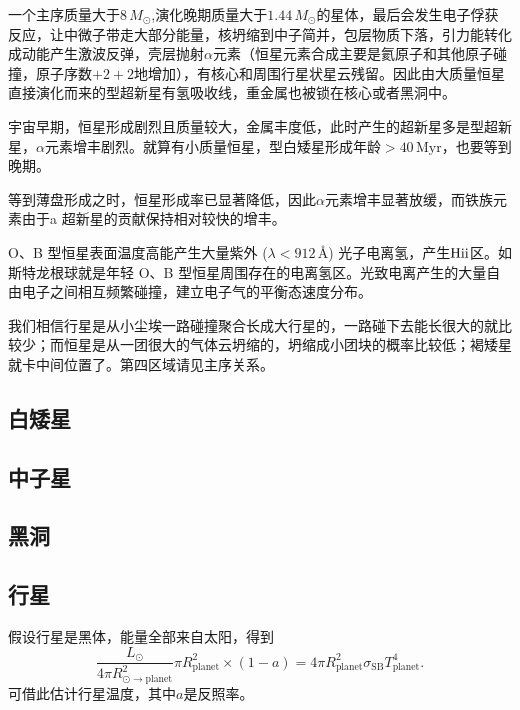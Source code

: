 \documentclass[../天体物理基础.tex]{subfiles}
\begin{document}
一个主序质量大于$8\,M_{\odot}$,演化晚期质量大于$1.44\,M_{\odot}$的星体，最后会发生电子俘获反应，让中微子带走大部分能量，核坍缩到中子简并，包层物质下落，引力能转化成动能产生激波反弹，壳层抛射$\alpha$元素（恒星元素合成主要是氦原子和其他原子碰撞，原子序数$+2+2$地增加），有核心和周围行星状星云残留。因此由大质量恒星直接演化而来的\uppercase\expandafter{}型超新星有氢吸收线，重金属也被锁在核心或者黑洞中。

宇宙早期，恒星形成剧烈且质量较大，金属丰度低，此时产生的超新星多是\uppercase\expandafter{}型超新星，$\alpha$元素增丰剧烈。就算有小质量恒星，\uppercase\expandafter{}型白矮星形成年龄$>40\,\mathrm{Myr}$，也要等到晚期。

等到薄盘形成之时，恒星形成率已显著降低，因此$\alpha$元素增丰显著放缓，而铁族元素由于\uppercase\expandafter{}a 超新星的贡献保持相对较快的增丰。

O、B 型恒星表面温度高能产生大量紫外 ($\lambda<912\,\si{\angstrom}$) 光子电离氢，产生$\mathrm{H\uppercase\expandafter{\romannumeral 2}}$区。如斯特龙根球就是年轻 O、B 型恒星周围存在的电离氢区。光致电离产生的大量自由电子之间相互频繁碰撞，建立电子气的平衡态速度分布。

我们相信行星是从小尘埃一路碰撞聚合长成大行星的，一路碰下去能长很大的就比较少；而恒星是从一团很大的气体云坍缩的，坍缩成小团块的概率比较低；褐矮星就卡中间位置了。第四区域请见主序关系。

\subsection{白矮星}

\subsection{中子星}

\subsection{黑洞}


\subsection{行星}
假设行星是黑体，能量全部来自太阳，得到
\begin{equation}
\frac{L_{\odot}}{4\pi R^{2}_{\odot\to\text{planet}}}\pi R_{\text{planet}}^{2}\times\left(1-a\right)=4\pi R_{\text{planet}}^{2}\sigma_{\text{SB}}T_{\text{planet}}^{4}.
\end{equation}
可借此估计行星温度，其中$a$是反照率。

\printbibliography
\end{document}
